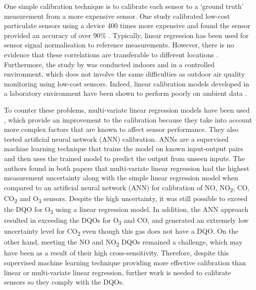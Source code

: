 \documentclass[11pt]{report}
\begin{document}
One simple calibration technique is to calibrate each sensor to a `ground truth' measurement from a more expensive sensor. One study calibrated low-cost particulate sensors using a device 400 times more expensive and found the sensor provided an accuracy of over 90\% \citep{thorpe2017RPimesh}. Typically, linear regression has been used for sensor signal normalisation to reference measurements. However, there is no evidence that these correlations are transferable to different locations \citep{Clements2017lowcostworkshop}. Furthermore, the study by \cite{thorpe2017RPimesh} was conducted indoors and in a controlled environment, which does not involve the same difficulties as outdoor air quality monitoring using low-cost sensors. Indeed, linear calibration models developed in a laboratory environment have been shown to perform poorly on ambient data \citep{Castell2017}.

To counter these problems, multi-variate linear regression models have been used \citep{Spinelle2015fieldcalibrationa,Spinelle2017fieldcalibrationb}, which provide an improvement to the calibration because they take into account more complex factors that are known to affect sensor performance. They also tested artificial neural network (ANN) calibration. ANNs are a supervised machine learning technique that trains the model on known input-output pairs and then uses the trained model to predict the output from unseen inputs. The authors found in both papers that multi-variate linear regression had the highest measurement uncertainty along with the simple linear regression model when compared to an artificial neural network (ANN) for calibration of NO, NO\textsubscript{2}, CO, CO\textsubscript{2} and O\textsubscript{3} sensors. Despite the high uncertainty, it was still possible to exceed the DQO for O\textsubscript{3} using a linear regression model. In addition, the ANN approach resulted in exceeding the DQOs for O\textsubscript{3} and CO, and generated an extremely low uncertainty level for CO\textsubscript{2} even though this gas does not have a DQO. On the other hand, meeting the NO and NO\textsubscript{2} DQOs remained a challenge, which may have been as a result of their high cross-sensitivity. Therefore, despite this supervised machine learning technique providing more effective calibration than linear or multi-variate linear regression, further work is needed to calibrate sensors so they comply with the DQOs.


\end{document}
